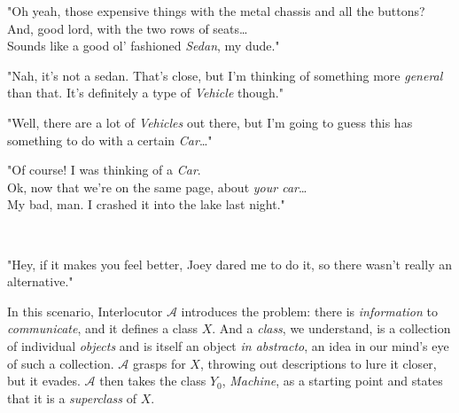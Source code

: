 \begin{addmargin}[2em]{8em}
"Oh yeah, those expensive things with the metal chassis and all the buttons? And, good lord, with the two rows of seats\dots \\[2.25mm]
Sounds like a good ol' fashioned \textit{Sedan}, my dude." \\
\end{addmargin}

\begin{addmargin}[8em]{2em}
	\begin{flushright}
		"Nah, it's not a sedan. That's close, but I'm thinking of something more \textit{general} than that. It's definitely a type of \textit{Vehicle} though." \\[\baselineskip]
	\end{flushright}
\end{addmargin}

\begin{addmargin}[2em]{8em}
	"Well, there are a lot of \textit{Vehicles} out there, but I'm going to guess this has something to do with a certain \textit{Car}\dots" \\
\end{addmargin}

\begin{addmargin}[8em]{2em}
	\begin{flushright}
		"Of course! I was thinking of a \textit{Car}. \\[2mm]
		Ok, now that we're on the same page, about \textit{your car}\dots \\
		My bad, man. I crashed it into the lake last night." \\[\baselineskip]
	\end{flushright}
\end{addmargin}

\begin{addmargin}[2em]{8em}
	\mydots \\
\end{addmargin}

\begin{addmargin}[8em]{2em}
	\begin{flushright}
		"Hey, if it makes you feel better, Joey dared me to do it, so there wasn't really an alternative." \\[\baselineskip]
	\end{flushright}
\end{addmargin}

In this scenario, Interlocutor $\mathcal{A}$ introduces the problem: there is \textit{information} to \textit{communicate}, and it defines a class $X$. And a \textit{class}, we understand, is a collection of individual \textit{objects} and is itself an object \textit{in abstracto}, an idea in our mind's eye of such a collection. $\mathcal{A}$ grasps for $X$, throwing out descriptions to lure it closer, but it evades. $\mathcal{A}$ then takes the class $Y_0$, \textit{Machine}, as a starting point and states that it is a \textit{superclass} of $X$. \\


